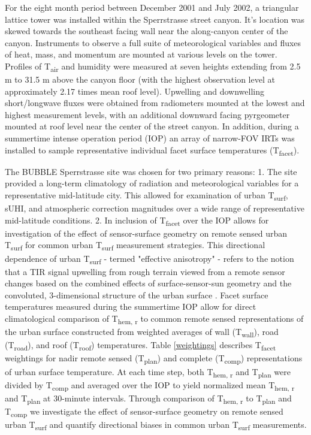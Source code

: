 \begin{bibunit}
For the eight month period between December 2001 and July 2002, a triangular lattice tower was installed within the Sperrstrasse street canyon. It's location was skewed towards the southeast facing wall near the along-canyon center of the canyon. Instruments to observe a full suite of meteorological variables and fluxes of heat, mass, and momentum are mounted at various levels on the tower. Profiles of T\textsubscript{air} and humidity were measured at seven heights extending from 2.5 \si{m} to 31.5 \si{m} above the canyon floor (with the highest observation level at approximately 2.17 times mean roof level). Upwelling and downwelling short/longwave fluxes were obtained from radiometers mounted at the lowest and highest measurement levels, with an additional downward facing pyrgeometer mounted at roof level near the center of the street canyon. In addition, during a summertime intense operation period (IOP) an array of narrow-FOV IRTs was installed to sample representative individual facet surface temperatures (T\textsubscript{facet}).

The BUBBLE Sperrstrasse site was chosen for two primary reasons: 1. The site provided a long-term climatology of radiation and meteorological variables for a representative mid-latitude city. This allowed for examination of urban T\textsubscript{surf}, sUHI, and atmospheric correction magnitudes over a wide range of representative mid-latitude conditions. 2.  In inclusion of T\textsubscript{facet} over the IOP allows for investigation of the effect of sensor-surface geometry on remote sensed urban T\textsubscript{surf} for common urban T\textsubscript{surf} measurement strategies. This directional dependence of urban T\textsubscript{surf} - termed "effective anisotropy" - refers to the notion that a TIR signal upwelling from rough terrain viewed from a remote sensor changes based on the combined effects of surface-sensor-sun geometry and the convoluted, 3-dimensional structure of the urban surface \cite{Voogt1998a}. Facet surface temperatures measured during the summertime IOP allow for direct climatological comparison of T\textsubscript{hem, r} to common remote sensed representations of the urban surface constructed from weighted averages of wall (T\textsubscript{wall}), road (T\textsubscript{road}), and roof (T\textsubscript{roof}) temperatures. Table \ref{weightings} describes T\textsubscript{facet} weightings for nadir remote sensed (T\textsubscript{plan}) and complete (T\textsubscript{comp}) representations of urban surface temperature. At each time step, both T\textsubscript{hem, r} and T\textsubscript{plan} were divided by T\textsubscript{comp} and averaged over the IOP to yield normalized mean T\textsubscript{hem, r} and T\textsubscript{plan} at 30-minute intervals. Through comparison of T\textsubscript{hem, r} to T\textsubscript{plan} and T\textsubscript{comp} we investigate the effect of sensor-surface geometry on remote sensed urban T\textsubscript{surf} and quantify directional biases in common urban T\textsubscript{surf} measurements. 


\end{bibunit}
